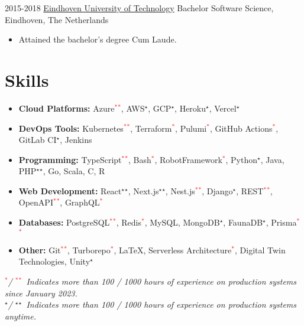 {     \customcventry
     {2015-2018}
     {\color{blue}\href{https://tue.nl/}{Eindhoven University of Technology}}
     {Bachelor Software Science,}
     {Eindhoven, The Netherlands}{}{}
     {
     	\begin{itemize}[leftmargin=0.6cm, label={\textbullet}]
     		\item Attained the bachelor's degree Cum Laude. 
     	\end{itemize}
     }
}

\section{Skills}
{
	\newcommand{\skilled}{\textcolor{black}{$^\star$}}
	\newcommand{\sskilled}{\skilled\skilled}
	\newcommand{\skilledRecent}{\textcolor{red}{$^*$}}
	\newcommand{\sskilledRecent}{\skilledRecent\skilledRecent}
			
	\begin{itemize}[label=\textbullet]
		\item {\textbf{Cloud Platforms:} Azure\sskilledRecent, AWS\skilled, GCP\skilled, Heroku\skilled, Vercel\skilled}
		\item {\textbf{DevOps Tools:} Kubernetes\sskilledRecent, Terraform\skilledRecent, Pulumi\skilledRecent, GitHub Actions\skilledRecent, GitLab CI\skilled, Jenkins}
		\item {\textbf{Programming:} TypeScript\sskilledRecent, Bash\skilledRecent, RobotFramework\skilledRecent, Python\skilled, Java, PHP\sskilled, Go, Scala, C, R}
		\item {\textbf{Web Development:} React\sskilled, Next.js\sskilled, Nest.js\sskilledRecent, Django\skilled, REST\sskilledRecent, OpenAPI\sskilledRecent, GraphQL\skilledRecent}
		\item {\textbf{Databases:} PostgreSQL\sskilledRecent, Redis\skilledRecent, MySQL, MongoDB\skilled, FaunaDB\skilled, Prisma\sskilledRecent}
		\item {\textbf{Other:} Git\sskilledRecent, Turborepo\skilledRecent, LaTeX, Serverless Architecture\skilledRecent, Digital Twin Technologies, Unity\skilled}
	\end{itemize}
	{\footnotesize%
		\vspace{-2mm}%
		\emph{%
			\hspace*{4mm}\skilledRecent / \sskilledRecent~Indicates more than 100 / 1000 hours of experience on production systems since January 2023.
			} \\
		\emph{%
			\hspace*{4mm}\skilled / \sskilled~Indicates more than 100 / 1000 hours of experience on production systems anytime.}
	}
			        
}
    

